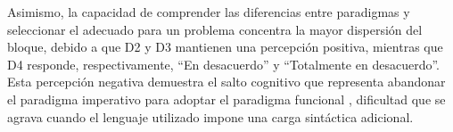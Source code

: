 Asimismo, la capacidad de comprender las diferencias entre paradigmas y seleccionar el adecuado para un problema concentra la mayor dispersión del bloque, debido a que D2 y D3 mantienen una percepción positiva, mientras que D4 responde, respectivamente, ``En desacuerdo'' y ``Totalmente en desacuerdo''. Esta percepción negativa demuestra el salto cognitivo que representa abandonar el paradigma imperativo para adoptar el paradigma funcional \cite{nemeth2019}, dificultad que se agrava cuando el lenguaje utilizado impone una carga sintáctica adicional.